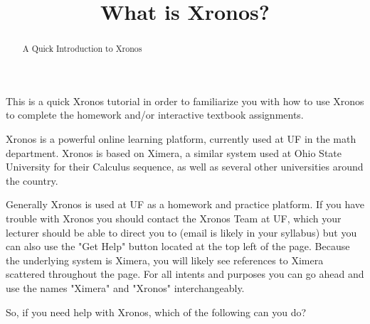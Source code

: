 \documentclass{ximeraXloud}
\title{What is Xronos?}
\begin{document}
\begin{abstract}
    A Quick Introduction to Xronos
\end{abstract}
\maketitle

This is a quick Xronos tutorial in order to familiarize you with how to use Xronos to complete the homework and/or interactive textbook assignments.

Xronos is a powerful online learning platform, currently used at UF in the math department. Xronos is based on Ximera, a similar system used at Ohio State University for their Calculus sequence, as well as several other universities around the country.

Generally Xronos is used at UF as a homework and practice platform. If you have trouble with Xronos you should contact the Xronos Team at UF, which your lecturer should be able to direct you to (email is likely in your syllabus) but you can also use the "Get Help" button located at the top left of the page. Because the underlying system is Ximera, you will likely see references to Ximera scattered throughout the page. For all intents and purposes you can go ahead and use the names "Ximera" and "Xronos" interchangeably.

\begin{question}
    So, if you need help with Xronos, which of the following can you do?
    
    \begin{selectAll}
    \end{selectAll}
\end{question}
\end{document}
